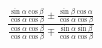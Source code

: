 \documentclass[preview]{standalone}
\begin{document}
\begin{align*}
\frac{\frac{\sin\alpha\cos\beta}{\cos\alpha\cos\beta}\pm\frac{\sin\beta\cos\alpha}{\cos\alpha\cos\beta}}{\frac{\cos\alpha\cos\beta}{\cos\alpha\cos\beta}\mp\frac{\sin\alpha\sin\beta}{\cos\alpha\cos\beta}}
\end{align*}
\end{document}
